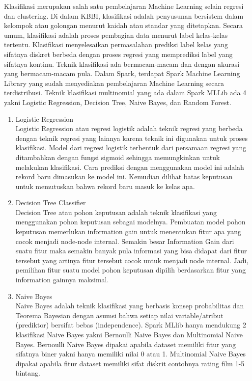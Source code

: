 \documentclass[a4paper,twoside]{article}
\begin{document}
\begin{enumerate}
Klasifikasi merupakan salah satu pembelajaran Machine Learning selain regresi dan clustering. Di dalam KBBI, klasifikasi adalah penyusunan bersistem dalam kelompok atau golongan menurut kaidah atau standar yang ditetapkan. Secara umum, klasifikasi adalah proses pembagian data menurut label kelas-kelas tertentu. Klasifikasi menyelesaikan permasalahan prediksi label kelas yang sifatnya diskret berbeda dengan proses regresi yang memprediksi label yang sifatnya kontinu. Teknik klasifikasi ada bermacam-macam dan dengan akurasi yang bermacam-macam pula. Dalam Spark, terdapat Spark Machine Learning Library yang sudah menyediakan pembelajaran Machine Learning secara terdistribusi. Teknik klasifikasi multinomial yang ada dalam Spark MLLib ada 4 yakni Logistic Regression, Decision Tree, Naive Bayes, dan Random Forest.

\begin{enumerate}
\item Logistic Regression\\
Logistic Regression atau regresi logistik adalah teknik regresi yang berbeda dengan teknik regresi yang lainnya karena teknik ini digunakan untuk proses klasifikasi. Model dari regresi logistik terbentuk dari persamaan regresi yang ditambahkan dengan fungsi sigmoid sehingga memungkinkan untuk melakukan klasifikasi. Cara prediksi dengan menggunakan model ini adalah rekord baru dimasukan ke model ini. Kemudian dilihat batas keputusan untuk memutuskan bahwa rekord baru masuk ke kelas apa.

\item Decision Tree Classifier\\
Decision Tree atau pohon keputusan adalah teknik klasifikasi yang menggunakan pohon keputusan sebagai modelnya. Pembuatan model pohon keputusan memerlukan information gain untuk menentukan fitur apa yang cocok menjadi node-node internal. Semakin besar Information Gain dari suatu fitur maka semakin banyak pula informasi yang bisa didapat dari fitur tersebut yang artinya fitur tersebut cocok untuk menjadi node internal. Jadi, pemilihan fitur suatu model pohon keputusan dipilih berdasarkan fitur yang information gainnya maksimal.

\item Naive Bayes\\
Naive Bayes adalah teknik klasifikasi yang berbasis konsep probabilitas dan Teorema Bayesian dengan asumsi bahwa setiap nilai variable/atribut (prediktor) bersifat bebas (independence). Spark MLlib hanya mendukung 2 klasifikasi Naive Bayes yakni Bernoulli Naive Bayes dan Multinomial Naive Bayes. Bernoulli Naive Bayes dipakai apabila dataset memiliki fitur yang sifatnya biner yakni hanya memiliki nilai 0 atau 1. Multinomial Naive Bayes dipakai apabila fitur dataset memiliki sifat diskrit contohnya rating film 1-5 bintang.


\end{enumerate}
\end{enumerate}
\end{document}
